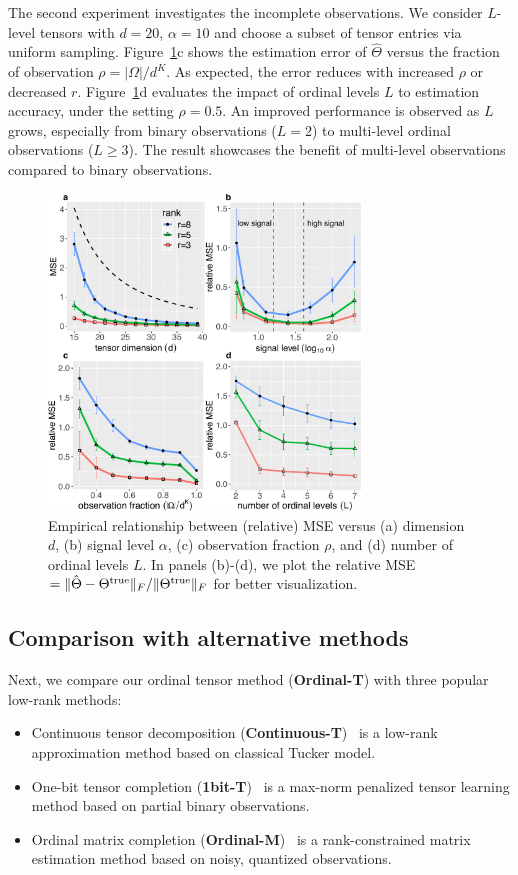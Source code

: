 \documentclass{article}
\theoremstyle{plain}
\theoremstyle{definition}
\begin{document}
The second experiment investigates the incomplete observations. We consider $L$-level tensors with $d=20$, $\alpha=10$ and choose a subset of tensor entries via uniform sampling. Figure~\ref{fig:finite}c shows the estimation error of $\hat \Theta$ versus the fraction of observation $\rho=|\Omega|/d^K$. As expected, the error reduces with increased $\rho$ or decreased $r$. Figure~\ref{fig:finite}d evaluates the impact of ordinal levels $L$ to estimation accuracy, under the setting $\rho=0.5$. An improved performance is observed as $L$ grows, especially from binary observations ($L=2$) to multi-level ordinal observations ($L\geq 3$). The result showcases the benefit of multi-level observations compared to binary observations.

\begin{figure}[http]
\includegraphics[width=8.3cm]{panel.pdf}
\vspace{-.1cm}
\caption{Empirical relationship between (relative) MSE versus (a) dimension $d$, (b) signal level $\alpha$, (c) observation fraction $\rho$, and (d) number of ordinal levels $L$. In panels (b)-(d), we plot the relative MSE $=\lVert\hat \Theta-\Theta^{\text{true}}\rVert_F/\lVert\Theta^{\text{true}}\rVert_F$ for better visualization.}
\label{fig:finite}
\vspace{-.1cm}
\end{figure}


\subsection{Comparison with alternative methods}
Next, we compare our ordinal tensor method ({\bf Ordinal-T}) with three popular low-rank methods:

\begin{itemize}[itemsep=0pt,topsep=0pt,leftmargin=*,partopsep=0pt]
\item Continuous tensor decomposition ({\bf Continuous-T})~\cite{acar2010scalable} is a low-rank approximation method based on classical Tucker model.
\item One-bit tensor completion ({\bf 1bit-T})~\cite{ghadermarzy2018learning} is a max-norm penalized tensor learning method based on partial binary observations.
\item Ordinal matrix completion ({\bf Ordinal-M})~\cite{bhaskar2016probabilistic} is a rank-constrained matrix estimation method based on noisy, quantized observations.
\end{itemize}
\end{document}
